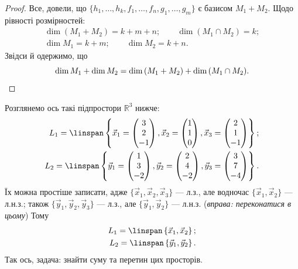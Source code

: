 \documentclass{math_library}
\begin{document}
\begin{proof}
	Все, довели, що $\{h_1, \dots, h_k, f_1, \dots, f_n, g_1, \dots, g_m\}$ є базисом $M_1 + M_2$. Щодо рівності розмірностей:
	\begin{align*}
	\dim{(M_1+M_2)} = k + m + n; \qquad \dim{(M_1 \cap M_2)} = k; \\
	\dim{M_1} = k + m; \qquad \dim{M_2} = k + n.
	\end{align*}
	Звідси й одержимо, що
	\[
	\dim{M_1} + \dim{M_2} = \dim{(M_1+M_2)} + \dim{(M_1 \cap M_2)}. \qedhere
	\]
	\end{proof}
	
	\begin{example}
	Розглянемо ось такі підпростори $\mathbb{R}^3$ нижче:
	\begin{align*}
	L_1 = \linspan\left\{ \vec{x}_1 = \begin{pmatrix} 3 \\ 2 \\ -1 \end{pmatrix}, \vec{x}_2 = \begin{pmatrix} 1 \\ 1 \\ 0 \end{pmatrix}, \vec{x}_3 = \begin{pmatrix} 2 \\ 1 \\ -1 \end{pmatrix}	 \right\};\\	
	L_2 = \linspan\left\{ \vec{y}_1 = \begin{pmatrix} 1 \\ 3 \\ -2 \end{pmatrix}, \vec{y}_2 = \begin{pmatrix} 2 \\ 4 \\ -2 \end{pmatrix}, \vec{y}_3 = \begin{pmatrix} 3 \\ 7 \\ -4 \end{pmatrix}	 \right\}.
	\end{align*}
	Їх можна простіше записати, адже $\{\vec{x}_1, \vec{x}_2, \vec{x}_3\}$ --- л.з., але водночас $\{\vec{x}_1,\vec{x}_2\}$ --- л.н.з.; також $\{\vec{y}_1,\vec{y}_2,\vec{y}_3\}$ --- л.з., але $\{\vec{y}_1,\vec{y}_2\}$ --- л.н.з. (\textit{вправа: переконатися в цьому}) Тому
	\begin{align*}
	L_1 = \linspan\left\{ \vec{x}_1, \vec{x}_2 \right\};\\
	L_2 = \linspan\left\{ \vec{y}_1, \vec{y}_2 \right\}.
	\end{align*}
	Так ось, задача: знайти суму та перетин цих просторів.
	

\end{example}
\end{document}
